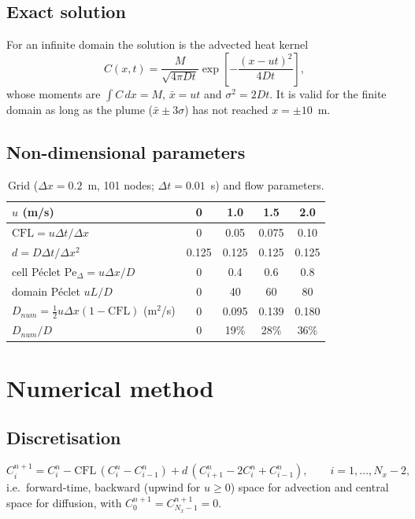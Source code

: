 \subsection{Exact solution}
For an infinite domain the solution is the advected heat kernel
\begin{equation}
C(x,t)=\frac{M}{\sqrt{4\pi Dt}}\exp\!\left[-\frac{(x-ut)^2}{4Dt}\right], \label{eq:exact}
\end{equation}
whose moments are $\int C\,dx=M$, $\bar x=ut$ and $\sigma^2=2Dt$. It is valid for the finite domain as long as the plume ($\bar x\pm3\sigma$) has not reached $x=\pm10$~m.

\subsection{Non-dimensional parameters}
\begin{table}[H]\centering\small
\begin{tabular}{lcccc}\toprule
$u$ (m/s) & 0 & 1.0 & 1.5 & 2.0\\\midrule
$\mathrm{CFL}=u\Delta t/\Delta x$ & 0 & 0.05 & 0.075 & 0.10\\
$d=D\Delta t/\Delta x^2$ & 0.125 & 0.125 & 0.125 & 0.125\\
cell P\'eclet $\mathrm{Pe}_\Delta=u\Delta x/D$ & 0 & 0.4 & 0.6 & 0.8\\
domain P\'eclet $uL/D$ & 0 & 40 & 60 & 80\\
$D_{num}=\tfrac12u\Delta x(1-\mathrm{CFL})$ (m$^2$/s) & 0 & 0.095 & 0.139 & 0.180\\
$D_{num}/D$ & 0 & 19\% & 28\% & 36\%\\\bottomrule
\end{tabular}\caption{Grid ($\Delta x=0.2$~m, 101 nodes; $\Delta t=0.01$~s) and flow parameters.}\end{table}

\section{Numerical method}
\subsection{Discretisation}
\begin{equation}
C_i^{n+1}=C_i^n-\mathrm{CFL}\,(C_i^n-C_{i-1}^n)+d\,(C_{i+1}^n-2C_i^n+C_{i-1}^n),\qquad i=1,\dots,N_x-2, \label{eq:scheme}
\end{equation}
i.e.\ forward-time, backward (upwind for $u\ge0$) space for advection and central space for diffusion, with $C_0^{n+1}=C_{N_x-1}^{n+1}=0$.

